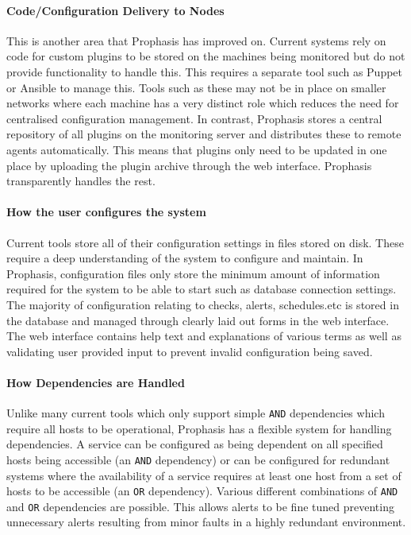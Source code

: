\documentclass[bsc,deptreport,twoside,parskip,singlespacing,notimes]{infthesis}
\begin{document}
\paragraph*{Code/Configuration Delivery to Nodes} %
	This is another area that Prophasis has improved on.  Current systems rely on code for
	custom plugins to be stored on the machines being monitored but do not provide
	functionality to handle this.  This requires a separate tool such as Puppet or
	Ansible to manage this. Tools such as these may not be in
	place on smaller networks where each machine has a very distinct role which
	reduces the need for centralised configuration management.  In contrast,
	Prophasis stores a central repository of all plugins on the monitoring server
	and distributes these to remote agents automatically.  This means that plugins
	only need to be updated in one place by uploading the plugin archive through
	the web interface. Prophasis transparently handles the rest.

\paragraph*{How the user configures the system}
	Current tools store all of their configuration settings in files stored on
	disk. These require a deep understanding of the system to configure and
	maintain. In Prophasis, configuration files only store the minimum amount of
	information required for the system to be able to start such as database
	connection settings.  The majority of configuration relating to checks, alerts,
	schedules.etc is stored in the database and managed through clearly laid out
	forms in the web interface.  The web interface contains help text and
	explanations of various terms as well as validating user provided input to
	prevent invalid configuration being saved.

\paragraph*{How Dependencies are Handled}
	Unlike many current tools which only support simple \texttt{AND} dependencies
	which require all hosts to be operational,
	Prophasis has a flexible system for handling dependencies. A service can be
	configured as being dependent on all specified hosts being accessible (an
	\texttt{AND} dependency) or can be configured for redundant systems where the
	availability of a service requires at least one host from a set of hosts to be
	accessible (an \texttt{OR} dependency).  Various different combinations of
	\texttt{AND} and \texttt{OR} dependencies are possible.  This allows alerts to
	be fine tuned preventing unnecessary alerts resulting from minor faults in a
	highly redundant environment.
\end{document}
